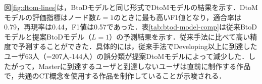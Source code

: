 \documentclass[submit,ses,noauthor]{ipsj}
\begin{document}

図\ref{fig:dtom-lines}は，BtoDモデルと同じ形式でDtoMモデルの結果を示す．DtoMモデルの評価指標はノード数$L=1$のときに最も高いF1値となり，適合率は0.79，再現率は0.44，F1値は0.57であった．表\ref{tab:btod-model-comp}は従来BtoDモデルと提案BtoDモデル（$L=1$）の予測結果を示す．従来手法に比べて高い精度で予測することができた．具体的には，従来手法でDeveloping以上に到達したユーザ63人（=207人-144人）の誤分類が提案DtoMモデルによって減少した．したがって，Masterに到達するユーザと到達しないユーザは直前に制作する作品で，共通のCT概念を使用する作品を制作していることが示唆される．
\end{document}
